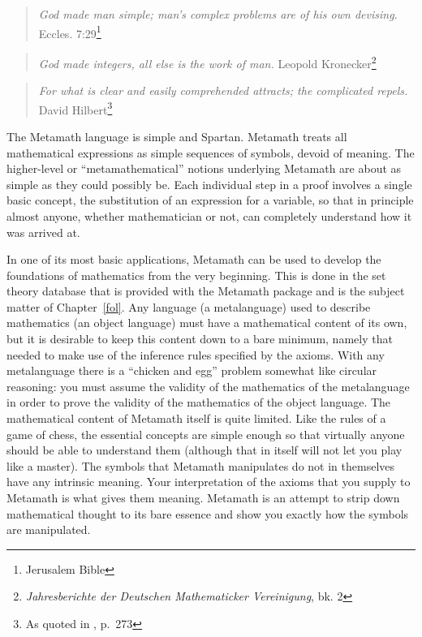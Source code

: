 \begin{quote}
  {\em God made man simple; man's complex problems are of his own
  devising.}
    \flushright\sc Eccles. 7:29\footnote{Jerusalem Bible}\\
\end{quote}

\begin{quote}
  {\em God made integers, all else is the work of man.}
    \flushright\sc Leopold Kronecker\footnote{{\em Jahresberichte der
Deutschen Mathematicker Vereinigung}, bk. 2}\\
\end{quote}

\begin{quote}
  {\em For what is clear and easily comprehended attracts; the
  complicated repels.}
    \flushright\sc David Hilbert\footnote{As quoted in \cite{deMillo},
p.~273}\\
\end{quote}

The Metamath language is simple and Spartan.  Metamath treats
all mathematical expressions as simple sequences of symbols, devoid of meaning.
The higher-level or ``metamathematical'' notions underlying Metamath are about
as simple as they could possibly be.  Each individual step in a proof involves
a single basic concept, the substitution of an expression for a variable, so
that in principle almost anyone, whether mathematician or not, can
completely understand how it was arrived at.

In one of its most basic applications, Metamath can be used to
develop the foundations of mathematics from
the very beginning.  This is done in the set theory database that is provided
with the Metamath package and is the subject matter
of Chapter~\ref{fol}. Any language (a metalanguage)
used to describe mathematics (an object language) must
have a mathematical content of its own, but it is desirable to keep this
content down to a bare minimum, namely that needed to make use of the
inference rules specified by the axioms.  With any metalanguage there is a
``chicken and egg'' problem somewhat like circular reasoning:  you must assume
the validity of the mathematics of the metalanguage in order to prove the
validity of the mathematics of the object language.  The mathematical content
of Metamath itself is quite limited.  Like the rules of a game of chess, the
essential concepts are simple enough so that virtually anyone should be able to
understand them (although that in itself will not let you play like
a master).  The symbols that Metamath manipulates do not in themselves
have any intrinsic meaning.  Your interpretation of the axioms that you supply
to Metamath is what gives them meaning.  Metamath is an attempt to strip down
mathematical thought to its bare essence and show you exactly how the symbols
are manipulated.

